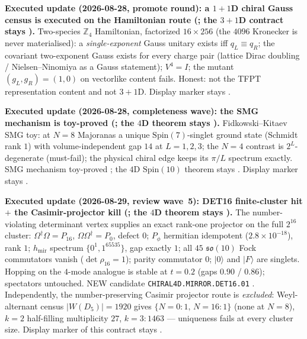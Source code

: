 \documentclass[11pt,a4paper]{article}
\begin{document}
\par\smallskip\noindent\textbf{Executed update (2026-08-28, promote round): a $1{+}1$D chiral
Gauss census is executed on the Hamiltonian route
(; the $3{+}1$D
contract stays \mO).}
Two-species $\mathbb Z_4$ Hamiltonian, factorized $16\times256$ (the $4096$ Kronecker is never
materialised): a \emph{single-exponent} Gauss unitary exists iff $q_L\equiv q_R$; the covariant
two-exponent Gauss exists for every charge pair (lattice Dirac doubling / Nielsen--Ninomiya as
a Gauss statement); $V^4=I$; the mutant $(g_L,g_R)=(1,0)$ on vectorlike content fails.
Honest: not the TFPT representation content and not $3{+}1$D.  Display marker stays \mO.

\par\smallskip\noindent\textbf{Executed update (2026-08-28, completeness wave): the SMG mechanism
is toy-proved
(; the $4$D theorem stays \mO).}
Fidkowski--Kitaev SMG toy: at $N=8$ Majoranas a unique $\mathrm{Spin}(7)$-singlet ground state
(Schmidt rank $1$) with volume-independent gap $14$ at $L=1,2,3$; the $N=4$ contrast is
$2^L$-degenerate (must-fail); the physical chiral edge keeps its $\pi/L$ spectrum exactly.
SMG mechanism toy-proved \mE; the $4$D $\mathrm{Spin}(10)$ theorem stays \mO.
Display marker stays \mO.

\par\smallskip\noindent\textbf{Executed update (2026-08-29, review wave~5): DET16 finite-cluster
hit $+$ the Casimir-projector kill
(; the $4$D theorem
stays \mO).}
The number-violating determinant vertex supplies an exact rank-one projector on the full
$2^{16}$ cluster: $\Omega^\dagger\Omega=P_{16}$, $\Omega\Omega^\dagger=P_0$, defect $0$;
$P_\phi$ hermitian idempotent ($2.8{\times}10^{-18}$), rank $1$; $h_{\mathrm{mir}}$ spectrum
$\{0^1,1^{65535}\}$, gap exactly $1$; all $45$ $\mathfrak{so}(10)$ Fock commutators vanish
($\det\rho_{16}=1$); parity commutator $0$; $\lvert0\rangle$ and $\lvert F\rangle$ are singlets.
Hopping on the $4$-mode analogue is stable at $t=0.2$ (gaps $0.90$ / $0.86$); spectators
untouched.  NEW candidate \texttt{CHIRAL4D.MIRROR.DET16.01} \mC.  Independently, the
number-preserving Casimir projector route is \emph{excluded}: Weyl-alternant census
$|W(D_5)|{=}1920$ gives $\{N{=}0{:}1,\,N{=}16{:}1\}$ (none at $N{=}8$), $k{=}2$ half-filling
multiplicity $27$, $k{=}3{:}1463$ --- uniqueness fails at every cluster size.  Display marker of
this contract stays \mO.
\end{document}

